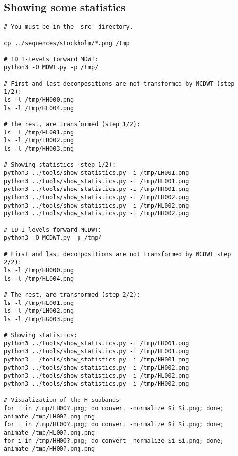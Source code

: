 \subsection{Showing some statistics}
\begin{verbatim}
# You must be in the 'src' directory.

cp ../sequences/stockholm/*.png /tmp

# 1D 1-levels forward MDWT:
python3 -O MDWT.py -p /tmp/

# First and last decompositions are not transformed by MCDWT (step 1/2):
ls -l /tmp/HH000.png
ls -l /tmp/HL004.png

# The rest, are transformed (step 1/2):
ls -l /tmp/HL001.png
ls -l /tmp/LH002.png
ls -l /tmp/HH003.png

# Showing statistics (step 1/2):
python3 ../tools/show_statistics.py -i /tmp/LH001.png
python3 ../tools/show_statistics.py -i /tmp/HL001.png
python3 ../tools/show_statistics.py -i /tmp/HH001.png
python3 ../tools/show_statistics.py -i /tmp/LH002.png
python3 ../tools/show_statistics.py -i /tmp/HL002.png
python3 ../tools/show_statistics.py -i /tmp/HH002.png

# 1D 1-levels forward MCDWT:
python3 -O MCDWT.py -p /tmp/

# First and last decompositions are not transformed by MCDWT step 2/2):
ls -l /tmp/HH000.png
ls -l /tmp/HL004.png

# The rest, are transformed (step 2/2):
ls -l /tmp/HL001.png
ls -l /tmp/LH002.png
ls -l /tmp/HG003.png

# Showing statistics:
python3 ../tools/show_statistics.py -i /tmp/LH001.png
python3 ../tools/show_statistics.py -i /tmp/HL001.png
python3 ../tools/show_statistics.py -i /tmp/HH001.png
python3 ../tools/show_statistics.py -i /tmp/LH002.png
python3 ../tools/show_statistics.py -i /tmp/HL002.png
python3 ../tools/show_statistics.py -i /tmp/HH002.png

# Visualization of the H-subbands
for i in /tmp/LH00?.png; do convert -normalize $i $i.png; done; animate /tmp/LH00?.png.png
for i in /tmp/HL00?.png; do convert -normalize $i $i.png; done; animate /tmp/HL00?.png.png
for i in /tmp/HH00?.png; do convert -normalize $i $i.png; done; animate /tmp/HH00?.png.png
\end{verbatim}

